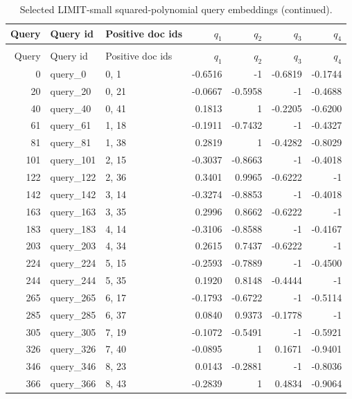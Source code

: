 {\scriptsize
\setlength{\tabcolsep}{3pt}
\begin{longtable}{@{}r l l r r r r@{}}
\caption{Selected LIMIT-small squared-polynomial query embeddings normalized into $[-1,1]^4$.}\label{tab:limit-small-cyclic-query-embeddings}\\
\toprule
Query & Query id & Positive doc ids & $q_1$ & $q_2$ & $q_3$ & $q_4$ \\
\midrule
\endfirsthead
\caption[]{Selected LIMIT-small squared-polynomial query embeddings (continued).}\\
\toprule
Query & Query id & Positive doc ids & $q_1$ & $q_2$ & $q_3$ & $q_4$ \\
\midrule
\endhead
0 & query\_0 & 0, 1 & -0.6516 & -1 & -0.6819 & -0.1744 \\
20 & query\_20 & 0, 21 & -0.0667 & -0.5958 & -1 & -0.4688 \\
40 & query\_40 & 0, 41 & 0.1813 & 1 & -0.2205 & -0.6200 \\
61 & query\_61 & 1, 18 & -0.1911 & -0.7432 & -1 & -0.4327 \\
81 & query\_81 & 1, 38 & 0.2819 & 1 & -0.4282 & -0.8029 \\
101 & query\_101 & 2, 15 & -0.3037 & -0.8663 & -1 & -0.4018 \\
122 & query\_122 & 2, 36 & 0.3401 & 0.9965 & -0.6222 & -1 \\
142 & query\_142 & 3, 14 & -0.3274 & -0.8853 & -1 & -0.4018 \\
163 & query\_163 & 3, 35 & 0.2996 & 0.8662 & -0.6222 & -1 \\
183 & query\_183 & 4, 14 & -0.3106 & -0.8588 & -1 & -0.4167 \\
203 & query\_203 & 4, 34 & 0.2615 & 0.7437 & -0.6222 & -1 \\
224 & query\_224 & 5, 15 & -0.2593 & -0.7889 & -1 & -0.4500 \\
244 & query\_244 & 5, 35 & 0.1920 & 0.8148 & -0.4444 & -1 \\
265 & query\_265 & 6, 17 & -0.1793 & -0.6722 & -1 & -0.5114 \\
285 & query\_285 & 6, 37 & 0.0840 & 0.9373 & -0.1778 & -1 \\
305 & query\_305 & 7, 19 & -0.1072 & -0.5491 & -1 & -0.5921 \\
326 & query\_326 & 7, 40 & -0.0895 & 1 & 0.1671 & -0.9401 \\
346 & query\_346 & 8, 23 & 0.0143 & -0.2881 & -1 & -0.8036 \\
366 & query\_366 & 8, 43 & -0.2839 & 1 & 0.4834 & -0.9064 \\

\end{longtable}}
